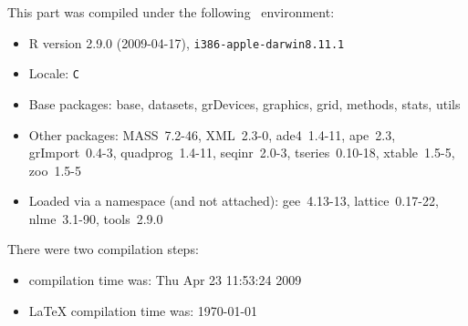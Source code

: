\documentclass{article}
\begin{document}
\begin{scriptsize}

This part was compiled under the following \Rlogo{}~environment:

\begin{itemize}
  \item R version 2.9.0 (2009-04-17), \verb|i386-apple-darwin8.11.1|
  \item Locale: \verb|C|
  \item Base packages: base, datasets, grDevices, graphics, grid,
    methods, stats, utils
  \item Other packages: MASS~7.2-46, XML~2.3-0, ade4~1.4-11,
    ape~2.3, grImport~0.4-3, quadprog~1.4-11, seqinr~2.0-3,
    tseries~0.10-18, xtable~1.5-5, zoo~1.5-5
  \item Loaded via a namespace (and not attached): gee~4.13-13,
    lattice~0.17-22, nlme~3.1-90, tools~2.9.0
\end{itemize}
There were two compilation steps:

\begin{itemize}
  \item \Rlogo{} compilation time was: Thu Apr 23 11:53:24 2009
  \item \LaTeX{} compilation time was: \today
\end{itemize}

\end{scriptsize}


\clearpage
{}


\end{document}

